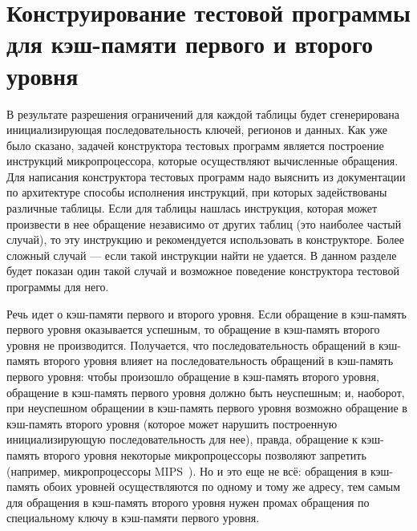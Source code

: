

\section{Конструирование тестовой программы для кэш-памяти первого и второго
уровня}\label{sec:L1L2_initialization}

В результате разрешения ограничений для каждой таблицы будет сгенерирована инициализирующая последовательность ключей, регионов и данных. Как уже было сказано, задачей
конструктора тестовых программ является построение инструкций микропроцессора,
которые осуществляют вычисленные обращения. Для написания конструктора тестовых
программ надо выяснить из документации по архитектуре способы исполнения
инструкций, при которых задействованы различные таблицы. Если для таблицы
нашлась инструкция, которая может произвести в нее обращение независимо от
других таблиц (это наиболее частый случай), то эту инструкцию и рекомендуется использовать в конструкторе. Более сложный
случай --- если такой инструкции найти не удается. В данном разделе будет
показан один такой случай и возможное поведение конструктора тестовой программы
для него.

Речь идет о кэш-памяти первого и второго уровня. Если обращение в кэш-память
первого уровня оказывается успешным, то обращение в кэш-память
второго уровня не производится. Получается, что последовательность обращений в
кэш-память второго уровня влияет на последовательность обращений в кэш-память
первого уровня: чтобы произошло обращение в кэш-память второго уровня, обращение
в кэш-память первого уровня должно быть неуспешным; и, наоборот, при неуспешном
обращении в кэш-память первого уровня возможно обращение в кэш-память второго
уровня (которое может нарушить построенную инициализирующую последовательность
для нее), правда, обращение к кэш-память второго уровня некоторые
микропроцессоры позволяют запретить (например, микропроцессоры
MIPS~\cite{mips64III}). Но и это еще не всё: обращения в кэш-память обоих
уровней осуществляются по одному и тому же адресу, тем самым для обращения в
кэш-память второго уровня нужен промах обращения по специальному ключу в
кэш-памяти первого уровня.

